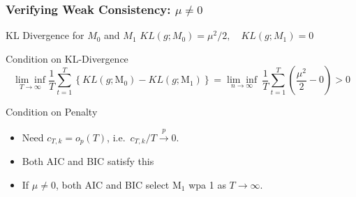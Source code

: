 %
%
%
%
%
\begin{frame}
  \frametitle{Verifying Weak Consistency: $\mu \neq 0$}

  \begin{block}{KL Divergence for $M_0$ and $M_1$}
$KL(g;M_0) = \mu^2/2, \quad KL(g;M_1) = 0$
  \end{block}

  \begin{block}{Condition on KL-Divergence}
  \small
  \vspace{-2em}
  \[
    \underset{T\rightarrow \infty}{\lim\inf} \frac{1}{T}\sum_{t = 1}^T \left\{ KL(g; \text{M}_0) - KL(g;\text{M}_1) \right\} = \underset{n\rightarrow \infty}{\lim\inf}\ \frac{1}{T}\sum_{t = 1}^T  \left(\frac{\mu^2}{2} - 0\right) > 0
  \]
\end{block}

\pause

\begin{block}{Condition on Penalty}
  \begin{itemize}
    \item Need $c_{T,k} = o_p(T)$, i.e.\ $c_{T,k}/T \overset{p}{\rightarrow} 0$.  
    \item Both AIC and BIC satisfy this
    \item If $\mu \neq 0$, both AIC and BIC select $\text{M}_1$ wpa 1 as $T\rightarrow \infty$.
  \end{itemize}
\end{block}
\end{frame}
